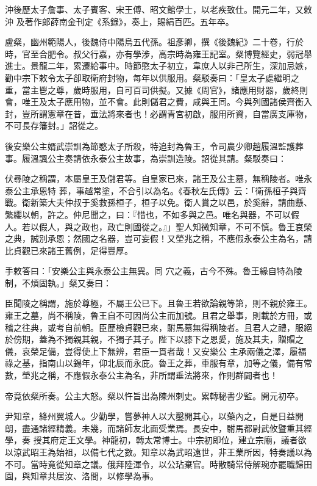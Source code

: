 \begin{pinyinscope}
 沖後歷太子詹事、太子賓客、宋王傅、昭文館學士，以老疾致仕。開元二年，又敕沖
 及著作郎薛南金刊定《系錄》，奏上，賜絹百匹。五年卒。



 盧粲，幽州範陽人，後魏侍中陽烏五代孫。祖彥卿，撰《後魏紀》二十卷，行於時，官至合肥令。叔父行嘉，亦有學涉，高宗時為雍王記室。粲博覽經史，弱冠舉進士。景龍二年，累遷給事中。時節愍太子初立，韋庶人以非己所生，深加忌嫉，勸中宗下敕令太子卻取衛府封物，每年以供服用。粲駁奏曰：「皇太子處繼明之重，當主鬯之尊，歲時服用，自可百司供擬。又據《周官》，諸應用財器，歲終則
 會，唯王及太子應用物，並不會。此則儲君之費，咸與王同。今與列國諸侯齊衡入封，豈所謂憲章在昔，垂法將來者也！必謂青宮初啟，服用所資，自當廣支庫物，不可長存籓封。」詔從之。



 後安樂公主婿武崇訓為節愍太子所殺，特追封為魯王，令司農少卿趙履溫監護葬事。履溫諷公主奏請依永泰公主故事，為崇訓造陵。詔從其請。粲駁奏曰：



 伏尋陵之稱謂，本屬皇王及儲君等。自皇家已來，諸王及公主墓，無稱陵者。唯永泰公主承恩特
 葬，事越常塗，不合引以為名。《春秋左氏傳》云：「衛孫桓子與齊戰。衛新築大夫仲叔于奚救孫桓子，桓子以免。衛人賞之以邑，於奚辭，請曲懸、繁纓以朝，許之。仲尼聞之，曰：『惜也，不如多與之邑。唯名與器，不可以假人。若以假人，與之政也，政亡則國從之。』」聖人知微知章，不可不慎。魯王哀榮之典，誠別承恩；然國之名器，豈可妄假！又塋兆之稱，不應假永泰公主為名，請比貞觀已來諸王舊例，足得豐厚。



 手敕答曰：「安樂公主與永泰公主無異。同
 穴之義，古今不殊。魯王緣自特為陵制，不煩固執。」粲又奏曰：



 臣聞陵之稱謂，施於尊極，不屬王公已下。且魯王若欲論親等第，則不親於雍王。雍王之墓，尚不稱陵，魯王自不可因尚公主而加號。且君之舉事，則載於方冊，或稽之往典，或考自前朝。臣歷檢貞觀已來，駙馬墓無得稱陵者。且君人之禮，服絕於傍期，蓋為不獨親其親，不獨子其子。陛下以膝下之恩愛，施及其夫，贈賵之儀，哀榮足備，豈得使上下無辨，君臣一貫者哉！又安樂公
 主承兩儀之澤，履福祿之基，指南山以錫年，仰北辰而永庇。魯王之葬，車服有章，加等之儀，備有常數，塋兆之稱，不應假永泰公主為名，非所謂垂法將來，作則群闢者也！



 帝竟依粲所奏。公主大怒。粲以忤旨出為陳州刺史。累轉秘書少監。開元初卒。



 尹知章，絳州翼城人。少勤學，嘗夢神人以大鑿開其心，以藥內之，自是日益開朗，盡通諸經精義。未幾，而諸師友北面受業焉。長安中，駙馬都尉武攸暨重其經學，奏
 授其府定王文學。神龍初，轉太常博士。中宗初即位，建立宗廟，議者欲以涼武昭王為始祖，以備七代之數。知章以為武昭遠世，非王業所因，特奏議以為不可。當時竟從知章之議。俄拜陸渾令，以公玷棄官。時散騎常侍解琬亦罷職歸田園，與知章共居汝、洛間，以修學為事。




\end{pinyinscope}
